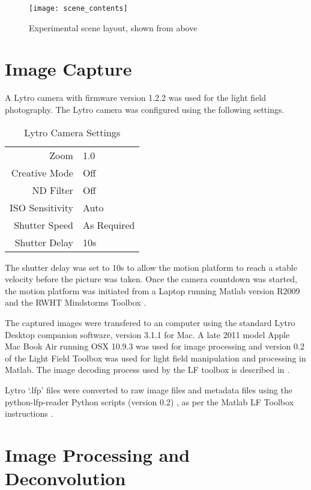 \begin{figure}[h]
\centering
\texttt{[image: scene\_contents]}
\caption[Experimental scene layout]{Experimental scene layout, shown from above}
\label{fig:scene_description}
\end{figure}


\section{Image Capture}
\label{sec:image_capture}

A Lytro camera with firmware version 1.2.2 was used for the light field photography.
The Lytro camera was configured using the following settings.

\begin{table}[h]
\centering
\caption{Lytro Camera Settings}
\label{tab:lytro_settings}
\begin{tabular}{r | l}
Zoom & 1.0 \\
Creative Mode & Off \\
ND Filter & Off \\
ISO Sensitivity & Auto \\
Shutter Speed & As Required \\
Shutter Delay & 10s \\
\end{tabular}
\end{table}

The shutter delay was set to 10s to allow the motion platform to reach a stable velocity before the picture was taken.
Once the camera countdown was started, the motion platform was initiated from a Laptop running Matlab version R2009 and the RWHT Mindstorms Toolbox \cite{rwth2007toolbox}.

The captured images were transfered to an computer using the standard Lytro Desktop companion software, version 3.1.1 for Mac.
A late 2011 model Apple Mac Book Air running OSX 10.9.3 was used for image processing and version 0.2 of the Light Field Toolbox \cite{dansereau2013toolbox} was used for light field manipulation and processing in Matlab.
The image decoding process used by the LF toolbox is described in \cite{dansereau2013decoding}.

Lytro \enquote*{.lfp} files were converted to raw image files and metadata files using the python-lfp-reader Python scripts (version 0.2) \cite{esfahbod2013python}, as per the Matlab LF Toolbox instructions \cite{dansereau2013toolbox}.

\section{Image Processing and Deconvolution}
\label{sec:image_processing_and_deconvolution}

